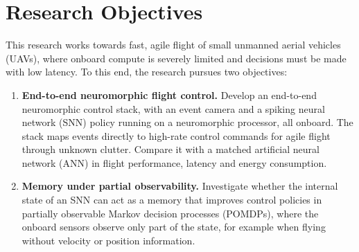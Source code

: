 \section{Research Objectives}
\label{sec:objectives}
This research works towards fast, agile flight of small unmanned aerial vehicles (UAVs), where onboard compute is severely limited and decisions must be made with low latency. To this end, the research pursues two objectives:
\begin{enumerate}
    \item \textbf{End-to-end neuromorphic flight control.} Develop an end-to-end neuromorphic control stack, with an event camera and a spiking neural network (SNN) policy running on a neuromorphic processor, all onboard. The stack maps events directly to high-rate control commands for agile flight through unknown clutter. Compare it with a matched artificial neural network (ANN) in flight performance, latency and energy consumption.
    \item \textbf{Memory under partial observability.} Investigate whether the internal state of an SNN can act as a memory that improves control policies in partially observable Markov decision processes (POMDPs), where the onboard sensors observe only part of the state, for example when flying without velocity or position information.
\end{enumerate}
